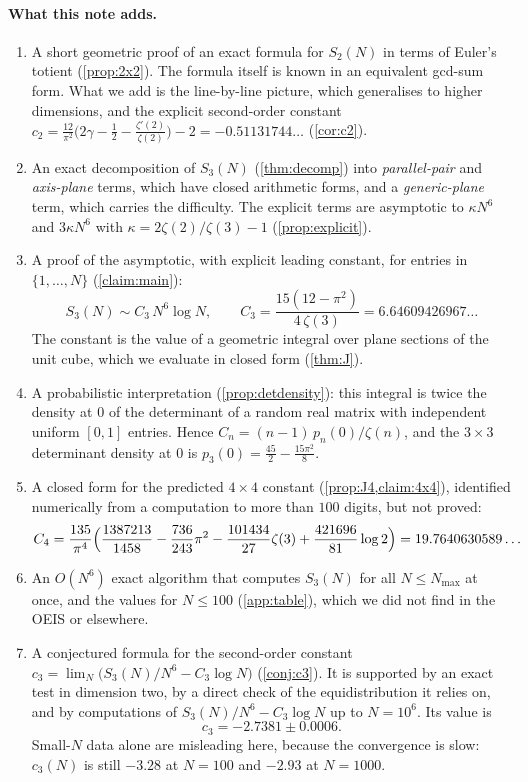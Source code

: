 \documentclass[11pt]{article}
\theoremstyle{definition}
\begin{document}
\paragraph{What this note adds.}
\begin{enumerate}[label=(\roman*)]
\item A short geometric proof of an exact formula for $S_2(N)$ in terms of Euler's totient (\cref{prop:2x2}). The formula itself is known in an equivalent gcd-sum form. What we add is the line-by-line picture, which generalises to higher dimensions, and the explicit second-order constant $c_2=\frac{12}{\pi^2}\bigl(2\gamma-\frac12-\frac{\zeta'(2)}{\zeta(2)}\bigr)-2=-0.51131744\ldots$ (\cref{cor:c2}).
\item An exact decomposition of $S_3(N)$ (\cref{thm:decomp}) into
\emph{parallel-pair} and \emph{axis-plane} terms, which have closed arithmetic forms, and a \emph{generic-plane} term, which carries the difficulty. The explicit terms are asymptotic to $\kappa N^6$ and $3\kappa N^6$ with $\kappa=2\zeta(2)/\zeta(3)-1$ (\cref{prop:explicit}).
\item A proof of the asymptotic, with explicit leading constant, for entries in $\{1,\dots,N\}$ (\cref{claim:main}):
\begin{equation}\label{eq:main}
\boxed{\;S_3(N)\sim C_3\,N^6\log N,\qquad C_3=\frac{15(12-\pi^2)}{4\,\zeta(3)}=6.64609426967\ldots\;}
\end{equation}
The constant is the value of a geometric integral over plane sections of the unit cube, which we evaluate in closed form (\cref{thm:J}).
\item A probabilistic interpretation (\cref{prop:detdensity}): this integral is twice the density at $0$ of the determinant of a random real matrix with independent uniform $[0,1]$ entries. Hence $C_n=(n-1)\,p_n(0)/\zeta(n)$, and the $3\times3$ determinant density at $0$ is $p_3(0)=\frac{45}{2}-\frac{15\pi^2}{8}$.
\item A closed form for the predicted $4\times4$ constant (\cref{prop:J4,claim:4x4}), identified numerically from a computation to more than $100$ digits, but not proved:
\[
C_4=\frac{135}{\pi^4}\Bigl(\frac{1387213}{1458}-\frac{736}{243}\pi^2-\frac{101434}{27}\zeta(3)+\frac{421696}{81}\log2\Bigr)=19.7640630589\ldots
\]
\item An $O(N^6)$ exact algorithm that computes $S_3(N)$ for all $N\le N_{\max}$ at once, and the values for $N\le 100$ (\cref{app:table}), which we did not find in the OEIS or elsewhere.
\item A conjectured formula for the second-order constant $c_3=\lim_{N}\bigl(S_3(N)/N^6-C_3\log N\bigr)$ (\cref{conj:c3}). It is supported by an exact test in dimension two, by a direct check of the equidistribution it relies on, and by computations of $S_3(N)/N^6-C_3\log N$ up to $N=10^6$. Its value is
\[
c_3=-2.7381\pm0.0006.
\]
Small-$N$ data alone are misleading here, because the convergence is slow: $c_3(N)$ is still $-3.28$ at $N=100$ and $-2.93$ at $N=1000$.
\end{enumerate}
\end{document}
